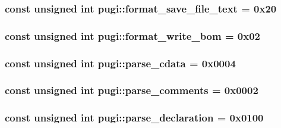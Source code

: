 \hypertarget{namespacepugi_ab0aae01dc0b870a2673c32ca6623ae09}{
\subsubsection[{format\-\_\-save\-\_\-file\-\_\-text}]{\setlength{\rightskip}{0pt plus 5cm}const unsigned int pugi\-::format\-\_\-save\-\_\-file\-\_\-text = 0x20}}\label{namespacepugi_ab0aae01dc0b870a2673c32ca6623ae09}
\hypertarget{namespacepugi_ab863bcafd203aeaa98953df3a998243f}{
\subsubsection[{format\-\_\-write\-\_\-bom}]{\setlength{\rightskip}{0pt plus 5cm}const unsigned int pugi\-::format\-\_\-write\-\_\-bom = 0x02}}\label{namespacepugi_ab863bcafd203aeaa98953df3a998243f}
\hypertarget{namespacepugi_a47b679897f8bc15e4e152978fc88c208}{
\subsubsection[{parse\-\_\-cdata}]{\setlength{\rightskip}{0pt plus 5cm}const unsigned int pugi\-::parse\-\_\-cdata = 0x0004}}\label{namespacepugi_a47b679897f8bc15e4e152978fc88c208}
\hypertarget{namespacepugi_adcab316176bfaf69158339962fb4ad38}{
\subsubsection[{parse\-\_\-comments}]{\setlength{\rightskip}{0pt plus 5cm}const unsigned int pugi\-::parse\-\_\-comments = 0x0002}}\label{namespacepugi_adcab316176bfaf69158339962fb4ad38}
\hypertarget{namespacepugi_adb5db03ce720dcd90e900b9bb7e70427}{
\subsubsection[{parse\-\_\-declaration}]{\setlength{\rightskip}{0pt plus 5cm}const unsigned int pugi\-::parse\-\_\-declaration = 0x0100}}\label{namespacepugi_adb5db03ce720dcd90e900b9bb7e70427}
